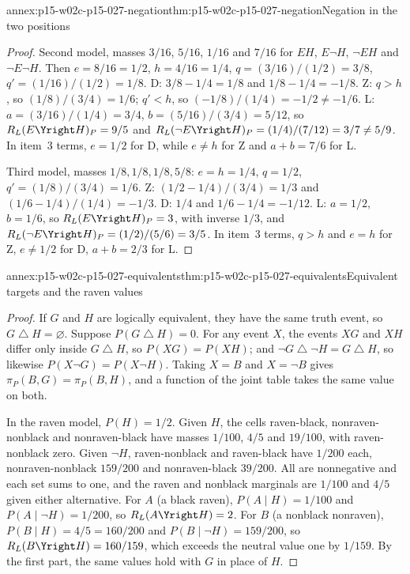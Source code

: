 \begin{annexitem}{annex:p15-w02c-p15-027-negation}{thm:p15-w02c-p15-027-negation}{Negation in the two positions}
\begin{proof}
Second model, masses \(3/16\), \(5/16\), \(1/16\) and \(7/16\) for
\(EH\), \(E\neg H\), \(\neg EH\) and \(\neg E\neg H\). Then
\(e=8/16=1/2\), \(h=4/16=1/4\),
\(q=(3/16)/(1/2)=3/8\), \(q'=(1/16)/(1/2)=1/8\). D:
\(3/8-1/4=1/8\) and \(1/8-1/4=-1/8\). Z: \(q>h\), so
\((1/8)/(3/4)=1/6\); \(q'<h\), so \((-1/8)/(1/4)=-1/2\ne-1/6\). L:
\(a=(3/16)/(1/4)=3/4\), \(b=(5/16)/(3/4)=5/12\), so
\(R_L(E\Yright H)_P=9/5\) and
\(R_L(\neg E\Yright H)_P=(1/4)/(7/12)=3/7\ne5/9\). In item~3 terms,
\(e=1/2\) for D, while \(e\ne h\) for Z and \(a+b=7/6\) for L.

Third model, masses \(1/8,1/8,1/8,5/8\): \(e=h=1/4\), \(q=1/2\),
\(q'=(1/8)/(3/4)=1/6\). Z: \((1/2-1/4)/(3/4)=1/3\) and
\((1/6-1/4)/(1/4)=-1/3\). D: \(1/4\) and \(1/6-1/4=-1/12\). L:
\(a=1/2\), \(b=1/6\), so \(R_L(E\Yright H)_P=3\), with inverse \(1/3\),
and \(R_L(\neg E\Yright H)_P=(1/2)/(5/6)=3/5\). In item~3 terms,
\(q>h\) and \(e=h\) for Z, \(e\ne1/2\) for D, \(a+b=2/3\) for L.
\end{proof}
\end{annexitem}

\begin{annexitem}{annex:p15-w02c-p15-027-equivalents}{thm:p15-w02c-p15-027-equivalents}{Equivalent targets and the raven values}
\begin{proof}
If \(G\) and \(H\) are logically equivalent, they have the same truth
event, so \(G\mathbin{\triangle}H=\varnothing\). Suppose
\(P(G\mathbin{\triangle}H)=0\). For any event \(X\), the events \(XG\)
and \(XH\) differ only inside \(G\mathbin{\triangle}H\), so
\(P(XG)=P(XH)\); and \(\neg G\mathbin{\triangle}\neg H=G\mathbin{\triangle}H\),
so likewise \(P(X\neg G)=P(X\neg H)\). Taking \(X=B\) and \(X=\neg B\)
gives \(\pi_P(B,G)=\pi_P(B,H)\), and a function of the joint table takes
the same value on both.

In the raven model, \(P(H)=1/2\). Given \(H\), the cells raven-black,
nonraven-nonblack and nonraven-black have masses \(1/100\), \(4/5\) and
\(19/100\), with raven-nonblack zero. Given \(\neg H\), raven-nonblack
and raven-black have \(1/200\) each, nonraven-nonblack \(159/200\) and
nonraven-black \(39/200\). All are nonnegative and each set sums to one,
and the raven and nonblack marginals are \(1/100\) and \(4/5\) given
either alternative. For \(A\) (a black raven), \(P(A\mid H)=1/100\) and
\(P(A\mid\neg H)=1/200\), so \(R_L(A\Yright H)=2\). For \(B\) (a
nonblack nonraven), \(P(B\mid H)=4/5=160/200\) and
\(P(B\mid\neg H)=159/200\), so \(R_L(B\Yright H)=160/159\), which exceeds
the neutral value one by \(1/159\). By the first part, the same values
hold with \(G\) in place of \(H\).
\end{proof}
\end{annexitem}

